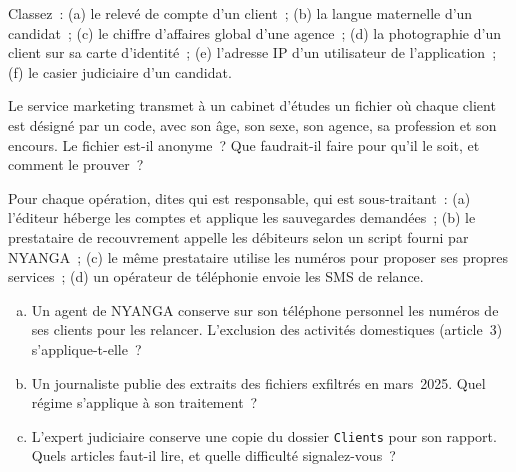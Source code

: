 \begin{boxexo}[title={\ding{45}\quad Exercice~1.1. Personnelle, sensible, ni l'une ni l'autre \niveaubase}]
Classez~: (a) le relevé de compte d'un client~; (b) la langue maternelle
d'un candidat~; (c) le chiffre d'affaires global d'une agence~; (d) la
photographie d'un client sur sa carte d'identité~; (e) l'adresse IP d'un
utilisateur de l'application~; (f) le casier judiciaire d'un candidat.
\end{boxexo}

\begin{boxexo}[title={\ding{45}\quad Exercice~1.2. Anonyme ou pseudonyme \niveaumoyen}]
Le service marketing transmet à un cabinet d'études un fichier où chaque
client est désigné par un code, avec son âge, son sexe, son agence, sa
profession et son encours. Le fichier est-il anonyme~? Que faudrait-il
faire pour qu'il le soit, et comment le prouver~?
\end{boxexo}

\begin{boxexo}[title={\ding{45}\quad Exercice~1.3. Qualifier les acteurs \niveaumoyen}]
Pour chaque opération, dites qui est responsable, qui est sous-traitant~:
(a) l'éditeur héberge les comptes et applique les sauvegardes demandées~;
(b) le prestataire de recouvrement appelle les débiteurs selon un script
fourni par NYANGA~; (c) le même prestataire utilise les numéros pour
proposer ses propres services~; (d) un opérateur de téléphonie envoie les
SMS de relance.
\end{boxexo}

\begin{boxexo}[title={\ding{45}\quad Exercice~1.4. Le champ de la loi \niveauexpert}]
\begin{enumerate}[(a)]
    \item Un agent de NYANGA conserve sur son téléphone personnel les
          numéros de ses clients pour les relancer. L'exclusion des
          activités domestiques (article~3) s'applique-t-elle~?
    \item Un journaliste publie des extraits des fichiers exfiltrés en
          mars~2025. Quel régime s'applique à son traitement~?
    \item L'expert judiciaire conserve une copie du dossier \texttt{Clients}
          pour son rapport. Quels articles faut-il lire, et quelle
          difficulté signalez-vous~?
\end{enumerate}
\end{boxexo}

\bigskip


